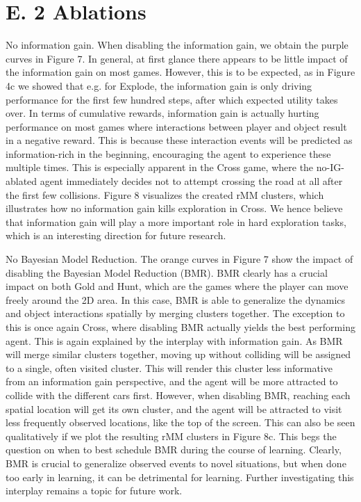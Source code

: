 \documentclass[10pt]{article}
\begin{document}
\section*{E. 2 Ablations}
No information gain. When disabling the information gain, we obtain the purple curves in Figure 7. In general, at first glance there appears to be little impact of the information gain on most games. However, this is to be expected, as in Figure 4c we showed that e.g. for Explode, the information gain is only driving performance for the first few hundred steps, after which expected utility takes over. In terms of cumulative rewards, information gain is actually hurting performance on most games where interactions between player and object result in a negative reward. This is because these interaction events will be predicted as information-rich in the beginning, encouraging the agent to experience these multiple times. This is especially apparent in the Cross game, where the no-IG-ablated agent immediately decides not to attempt crossing the road at all after the first few collisions. Figure 8 visualizes the created rMM clusters, which illustrates how no information gain kills exploration in Cross. We hence believe that information gain will play a more important role in hard exploration tasks, which is an interesting direction for future research.

No Bayesian Model Reduction. The orange curves in Figure 7 show the impact of disabling the Bayesian Model Reduction (BMR). BMR clearly has a crucial impact on both Gold and Hunt, which are the games where the player can move freely around the 2D area. In this case, BMR is able to generalize the dynamics and object interactions spatially by merging clusters together. The exception to this is once again Cross, where disabling BMR actually yields the best performing agent. This is again explained by the interplay with information gain. As BMR will merge similar clusters together, moving up without colliding will be assigned to a single, often visited cluster. This will render this cluster less informative from an information gain perspective, and the agent will be more attracted to collide with the different cars first. However, when disabling BMR, reaching each spatial location will get its own cluster, and the agent will be attracted to visit less frequently observed locations, like the top of the screen. This can also be seen qualitatively if we plot the resulting rMM clusters in Figure 8c. This begs the question on when to best schedule BMR during the course of learning. Clearly, BMR is crucial to generalize observed events to novel situations, but when done too early in learning, it can be detrimental for learning. Further investigating this interplay remains a topic for future work.
\end{document}

